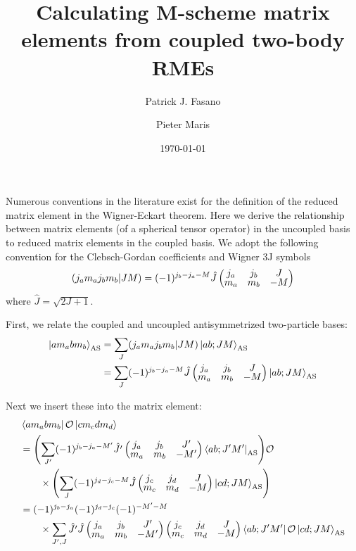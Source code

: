 \documentclass[%
  aps,%
  prc,%
  showpacs,%
  superscriptaddress,%
  onecolumn,%
  notitlepage,%
  12pt,%
  floatfix,%
  amsmath,%
  amssymb,%
]{revtex4-1}
\newcommand{\threej}[6]{
  \renewcommand\arraystretch{0.6667}\begin{pmatrix} #1&#3&#5\\#2&#4&#6 \end{pmatrix}\renewcommand\arraystretch{1}
}
\begin{document}
\title{Calculating M-scheme matrix elements from coupled two-body RMEs}

\author{Patrick J. Fasano}

\author{Pieter Maris}

\date{\today}

\maketitle


Numerous conventions in the literature exist for the definition of the reduced
matrix element in the Wigner-Eckart theorem. Here we derive the relationship
between matrix elements (of a spherical tensor operator) in the uncoupled basis
to reduced matrix elements in the coupled basis. We adopt the following convention
for the Clebsch-Gordan coefficients and Wigner 3J symbols \cite{suhonen2007:nucleons-nucleus}
\begin{equation}
  (j_a m_a j_b m_b \vert J M) = (-1)^{j_b-j_a-M}\hat{J} \threej{j_a}{m_a}{j_b}{m_b}{J}{-M}
\end{equation}
where \(\hat{J} = \sqrt{2J+1}\).

First, we relate the coupled and uncoupled antisymmetrized two-particle bases:
\begin{align}
  \ket{a m_a b m_b}_\mathrm{AS} &= \sum_J (j_a m_a j_b m_b \vert J M) \ket{a b; J M}_\mathrm{AS}\\
  &=\sum_J (-1)^{j_b-j_a-M}\hat{J} \threej{j_a}{m_a}{j_b}{m_b}{J}{-M} \ket{a b; J M}_\mathrm{AS}
\end{align}

Next we insert these into the matrix element:
\begin{align*}
  & \bra{a m_a b m_b}\mathcal{O}\ket{c m_c d m_d} \\
    &= \qty(\sum_{J'} (-1)^{j_b-j_a-M'}\hat{J'} \threej{j_a}{m_a}{j_b}{m_b}{J'}{-M'} \bra{a b; J' M'}_\mathrm{AS})
      \mathcal{O} \\
    &\qquad \times \qty(\sum_J (-1)^{j_d-j_c-M}\hat{J} \threej{j_c}{m_c}{j_d}{m_d}{J}{-M} \ket{c d; J M}_\mathrm{AS})\\
    &= (-1)^{j_b -j_a} (-1)^{j_d-j_c} (-1)^{-M'-M} \\
    &\qquad \times \sum_{J',J} \hat{J'} \hat{J} \threej{j_a}{m_a}{j_b}{m_b}{J'}{-M'}
      \threej{j_c}{m_c}{j_d}{m_d}{J}{-M} \bra{ab;J'M'}\mathcal{O}\ket{cd;JM}_\mathrm{AS}
\end{align*}
\end{document}
